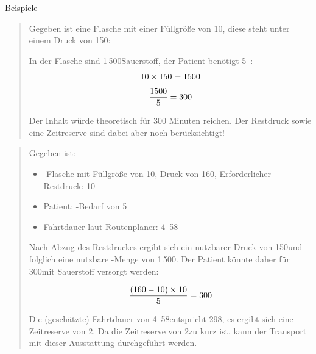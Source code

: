 \begin{Synopsis}
\end{Synopsis}






\Text
{Beispiele}%
{%
\begin{quote}
Gegeben ist eine Flasche mit einer Füllgröße von 10\Liter*, diese
steht unter einem Druck von 150\Bar*:  

In der Flasche sind 1\,500\Liter* Sauerstoff, 
der Patient benötigt 5\,\unitfrac{\Liter}{\Min} : 
\begin{equation}
10 \times 150 = 1500
\notag
\end{equation}
\begin{equation}
\frac{1500}{5} = 300
\notag
\end{equation}

Der Inhalt würde theoretisch für 300 Minuten reichen. Der
Restdruck sowie eine Zeitreserve sind dabei
aber noch  berücksichtigt!
\end{quote}


\begin{quote}
Gegeben ist: 
\begin{itemize}
  \item {}-Flasche mit Füllgröße von 10\Liter*, Druck von
160\Bar*, Erforderlicher Restdruck: 10\Bar*
\item Patient: -Bedarf von 5\LPerMin*
\item Fahrtdauer laut Routenplaner:
4\Hour*~58\Min*
\end{itemize}

Nach Abzug des Restdruckes ergibt sich ein nutzbarer Druck
von 150\Bar* und folglich eine nutzbare -Menge von
1\,500\Liter*. Der Patient könnte daher für 300\Min* mit
Sauerstoff versorgt werden: 

\begin{equation}
\frac{(160 - 10) \times 10}{5} = 300
\notag
\end{equation}

Die (geschätzte) Fahrtdauer
von 4\Hour*~58\Min* entspricht 298\Min*, es ergibt sich
eine Zeitreserve von 2\Min*.
Da die Zeitreserve von 2\Min* zu kurz ist, kann der
Transport mit dieser Ausstattung  durchgeführt
werden. 
\end{quote}
}%





